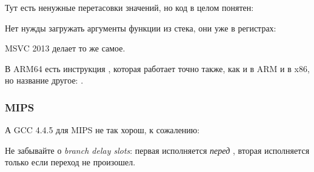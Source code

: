 

Тут есть ненужные перетасовки значений, но код в целом понятен:




Нет нужды загружать аргументы функции из стека, они уже в регистрах:



MSVC 2013 делает то же самое.

В ARM64 есть инструкция , которая работает точно также, как и  в ARM и  в x86,
но название другое: .



\subsubsection{MIPS}

А GCC 4.4.5 для MIPS не так хорош, к сожалению:



Не забывайте о \emph{branch delay slots}: первая  исполняется \emph{перед} ,
вторая  исполняется только если переход не произошел.

